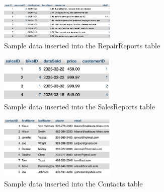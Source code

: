 \documentclass{article}
\begin{document}
\begin{figure}[H]
    \centering
    \includegraphics[width=0.5\textwidth]{RepairReports.png}
    \caption{Sample data inserted into the RepairReports table}
    \label{fig:RepairReports}
\end{figure}

\begin{figure}[H]
    \centering
    \includegraphics[width=0.5\textwidth]{SalesReports.png}
    \caption{Sample data inserted into the SalesReports table}
    \label{fig:SalesReports}
\end{figure}

\begin{figure}[H]
    \centering
    \includegraphics[width=0.5\textwidth]{Contacts.png}
    \caption{Sample data inserted into the Contacts table}
    \label{fig:Contacts}
\end{figure}

\end{document}
